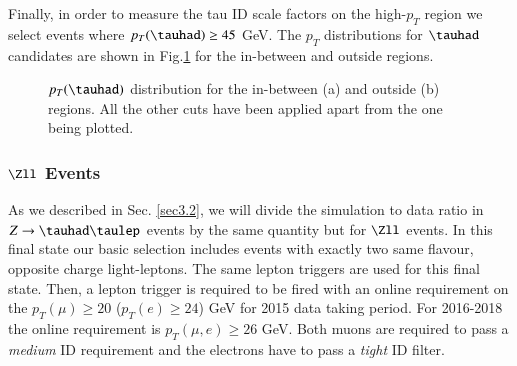 Finally, in order to measure the tau ID scale factors on the high-$p_T$ region we select events where $p_T(\tauhad)\geq 45$ GeV. The $p_T$ distributions for $\tauhad$ candidates are shown in Fig.\ref{Fig6} for the in-between and outside regions.
\begin{figure}[htbp]
	\centering
	\hfill
	\caption{$p_T(\tauhad)$ distribution for the in-between (a) and outside (b) regions. All the other cuts have been applied apart from the one being plotted.}
	\label{Fig6}
\end{figure} 
\subsubsection{$\Zll$ Events}\label{sec3.3.2}
As we described in Sec. \ref{sec3.2}, we will divide the simulation to data ratio in $Z\to\tauhad\taulep$ events by the same quantity but for $\Zll$ events. In this final state our basic selection includes events with exactly two same flavour, opposite charge light-leptons. The same lepton triggers are used for this final state. Then, a lepton trigger is required to be fired with an online requirement on the $p_{T}(\mu)\geq 20$ ($p_{T}(e)\geq 24$) GeV for 2015 data taking period. For 2016-2018 the online requirement is $p_{T}(\mu,e)\geq 26$ GeV. Both muons are required to pass a \textit{medium} ID requirement and the electrons have to pass a \textit{tight} ID filter. 

